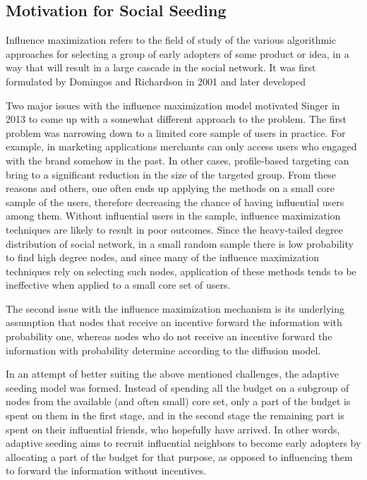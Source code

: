 \subsection{Motivation for Social Seeding}



Influence maximization refers to the field of study of the various algorithmic
 approaches for selecting a group of early adopters of some product or idea,
 in a way that will result in a large cascade in the social network.
 It was first formulated by Domingos and Richardson in 2001 and later developed 

Two major issues with the influence maximization model motivated Singer
 in 2013 \cite{seeman2013adaptive} to come up with a somewhat different approach to the problem.
 The first problem was narrowing down to a limited core sample of users
 in practice.
 For example, in marketing applications merchants can only access users
 who engaged with the brand somehow in the past.
 In other cases, profile-based targeting can bring to a significant reduction
 in the size of the targeted group.
 From these reasons and others, one often ends up applying the methods on
 a small core sample of the users, therefore decreasing the chance of having
 influential users among them.
 Without influential users in the sample, influence maximization techniques
 are likely to result in poor outcomes.
 Since the heavy-tailed degree distribution of social network, in a small
 random sample there is low probability to find high degree nodes, and since
 many of the influence maximization techniques rely on selecting such nodes,
 application of these methods tends to be ineffective when applied to a
 small core set of users.

The second issue with the influence maximization mechanism is its underlying
 assumption that nodes that receive an incentive forward the information
 with probability one, whereas nodes who do not receive an incentive forward
 the information with probability determine according to the diffusion
 model.

In an attempt of better suiting the above mentioned challenges, the adaptive
 seeding model was formed.
 Instead of spending all the budget on a subgroup of nodes from the available
 (and often small) core set, only a part of the budget is spent on them
 in the first stage, and in the second stage the remaining part is spent
 on their influential friends, who hopefully have arrived.
 In other words, adaptive seeding aims to recruit influential neighbors
 to become early adopters by allocating a part of the budget for
 that purpose, as opposed to influencing them to forward the information
 without incentives.

